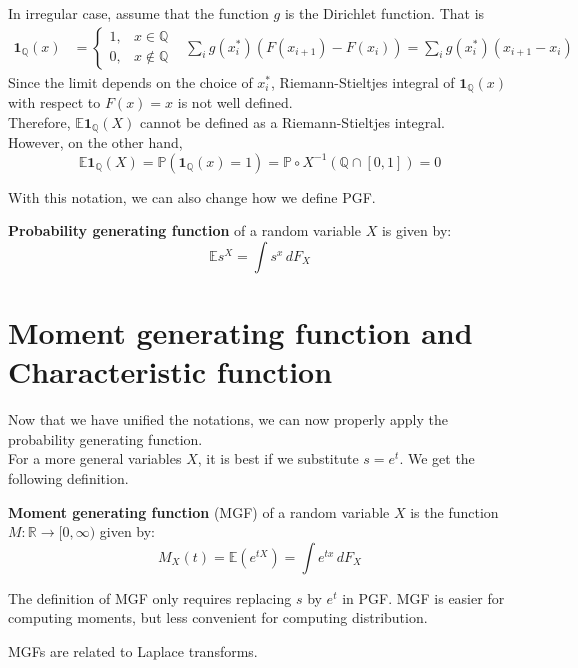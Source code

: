 \documentclass{huhtakm-template-book}
\newcommand{\prob}{\mathbb{P}}
\newcommand{\expect}{\mathbb{E}}
\begin{document}
\begin{eg}
	In irregular case, assume that the function $g$ is the Dirichlet function. That is
	\begin{align*}
		\mathbf{1}_{\mathbb{Q}}(x)&=\begin{cases}
			1, &x\in\mathbb{Q}\\
			0, &x\not\in\mathbb{Q}
		\end{cases} & \sum_{i}g(x_{i}^{*})(F(x_{i+1})-F(x_{i}))=\sum_{i}g(x_{i}^{*})(x_{i+1}-x_{i})
	\end{align*}
	Since the limit depends on the choice of $x_{i}^{*}$, Riemann-Stieltjes integral of $\mathbf{1}_{\mathbb{Q}}(x)$ with respect to $F(x)=x$ is not well defined.\\
	Therefore, $\expect\mathbf{1}_{\mathbb{Q}}(X)$ cannot be defined as a Riemann-Stieltjes integral.\\
	However, on the other hand,
	\begin{equation*}
		\expect\mathbf{1}_{\mathbb{Q}}(X)=\prob(\mathbf{1}_{\mathbb{Q}}(x)=1)=\prob\circ X^{-1}(\mathbb{Q}\cap[0,1])=0
	\end{equation*}
\end{eg}
With this notation, we can also change how we define PGF.
\begin{defn}
	\textbf{Probability generating function} of a random variable $X$ is given by:
	\begin{equation*}
		\expect s^{X}=\int s^{x}\,dF_{X}
	\end{equation*}
\end{defn}
\section{Moment generating function and Characteristic function}
Now that we have unified the notations, we can now properly apply the probability generating function.\\
For a more general variables $X$, it is best if we substitute $s=e^{t}$. We get the following definition.
\begin{defn}
	\textbf{Moment generating function} (MGF) of a random variable $X$ is the function $M:\mathbb{R}\to[0,\infty)$ given by:
	\begin{equation*}
		M_{X}(t)=\expect(e^{tX})=\int e^{tx}\,dF_{X}
	\end{equation*}
\end{defn}
\begin{rem}
	The definition of MGF only requires replacing $s$ by $e^{t}$ in PGF. MGF is easier for computing moments, but less convenient for computing distribution.
\end{rem}
\begin{rem}
	MGFs are related to Laplace transforms.
\end{rem}
\end{document}
